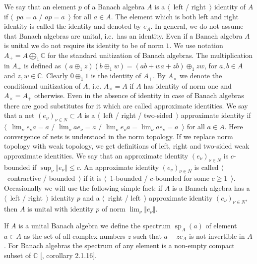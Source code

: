 We say that an element $p$ of a Banach algebra $A$ is a $\langle$~left /
right~$\rangle$ identity of $A$ if $\langle$~$pa=a$ / $ap=a$~$\rangle$ for all
$a\in A$. The element which is both left and right identity is called the
identity and denoted by $e_A$. In general, we do not assume that Banach algebras
are unital, i.e.\ has an identity. Even if a Banach algebra $A$ is unital we do
not require its identity to be of norm $1$. We use notation
$A_+=A\bigoplus_1\mathbb{C}$ for the standard unitization of Banach algebras.
The multiplication in $A_+$ is defined as $(a\oplus_1 z)(b\oplus_1
w)=(ab+wa+zb)\oplus_1 zw$, for $a,b\in A$ and $z,w\in\mathbb{C}$. Clearly
$0\oplus_1 1$ is the identity of $A_+$. By $A_\times$ we denote the conditional
unitization of $A$, i.e. $A_\times=A$ if $A$ has identity of norm one and
$A_\times=A_+$ otherwise. Even in the absence of identity in case of Banach
algebras there are good substitutes for it which are called approximate
identities. We say that a net ${(e_\nu)}_{\nu\in N}\subset A$ is a 
$\langle$~left / right / two-sided~$\rangle$ approximate identity if 
$\langle$~$\lim_\nu e_\nu a=a$ / $\lim_\nu ae_\nu=a$ / 
$\lim_\nu e_\nu a=\lim_\nu ae_\nu=a$~$\rangle$ for
all $a\in A$. Here convergence of nets is understood
in the norm topology. If we replace norm topology with weak topology, we get
definitions of left, right and two-sided weak approximate identities. We say
that an approximate identity ${(e_\nu)}_{\nu\in N}$ is $c$-bounded if
$\sup_\nu\Vert e_\nu\Vert\leq c$. An approximate identity ${(e_\nu)}_{\nu\in N}$
is called $\langle$~contractive / bounded~$\rangle$ if it is
$\langle$~$1$-bounded / $c$-bounded for some $c\geq 1$~$\rangle$. Occasionally
we will use the following simple fact: if $A$ is a Banach algebra has a
$\langle$~left / right~$\rangle$ identity $p$ and a $\langle$~right /
left~$\rangle$ approximate identity ${(e_\nu)}_{\nu\in N}$, then $A$ is unital
with identity $p$ of norm $\lim_\nu\Vert e_\nu\Vert$. 

If $A$ is a unital Banach algebra we define the spectrum
$\operatorname{sp}_A(a)$ of element $a\in A$ as the set of all complex numbers
$z$ such that $a-ze_A$ is not invertible in $A$. For Banach algebras the
spectrum of any element is a non-empty compact subset of $\mathbb{C}$
[\cite{HelBanLocConvAlg}, corollary 2.1.16].

